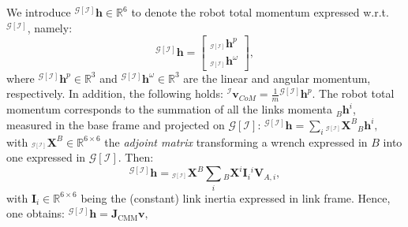 We introduce ${}^{\mathcal{G}[\mathcal{I}]} \boldsymbol{h} \in \mathbb{R}^6$ to denote the robot total momentum expressed w.r.t. ${}^{\mathcal{G}[\mathcal{I}]}$, namely:
\begin{equation}
	{}^{\mathcal{G}[\mathcal{I}]} \boldsymbol{h} = \begin{bmatrix}
		{}_{{}^{\mathcal{G}[\mathcal{I}]}} \boldsymbol{h}^p \\
		{}_{{}^{\mathcal{G}[\mathcal{I}]}} \boldsymbol{h}^\omega
	\end{bmatrix},
\end{equation}
where ${}^{\mathcal{G}[\mathcal{I}]} \boldsymbol{h}^p \in \mathbb{R}^3$ and ${}^{\mathcal{G}[\mathcal{I}]} \boldsymbol{h}^\omega \in \mathbb{R}^3$ are the linear and angular momentum, respectively. In addition, the following holds:
	${}^{\mathcal{I}}\boldsymbol{v}_{CoM}  = \frac{1}{m}{} {{}^{\mathcal{G}[\mathcal{I}]}} \boldsymbol{h}^p.$
The robot total momentum corresponds to the summation of all the links momenta ${}_B\boldsymbol{h}^i$, measured in the base frame and projected on ${\mathcal{G}[\mathcal{I}]}$:
	${}^{\mathcal{G}[\mathcal{I}]}\boldsymbol{h} = \sum_i {}_{{}^{\mathcal{G}[\mathcal{I}]}} \boldsymbol{X}^B {}_B\boldsymbol{h}^i,$
with ${}_{{}^{\mathcal{G}[\mathcal{I}]}} \boldsymbol{X}^B \in \mathbb{R}^{6\times6}$ the \emph{adjoint matrix}  transforming a wrench expressed in $B$ into one expressed in ${\mathcal{G}[\mathcal{I}]}$. 
Then: 
\begin{equation}\label{eq:momentumExpanded}
	{}^{\mathcal{G}[\mathcal{I}]} \boldsymbol{h} = {}_{{}^{\mathcal{G}[\mathcal{I}]}} \boldsymbol{X}^B \sum_i {}_{B}\boldsymbol{X}^i \boldsymbol{I}_i {}^i \boldsymbol{V}_{A,i},
\end{equation}
with $\boldsymbol{I}_i \in \mathbb{R}^{6\times 6}$ being the (constant) link inertia expressed in link frame. Hence, one obtains:
	${}^{\mathcal{G}[\mathcal{I}]} \boldsymbol{h} = \boldsymbol{J}_\text{CMM}\boldsymbol{v},$

